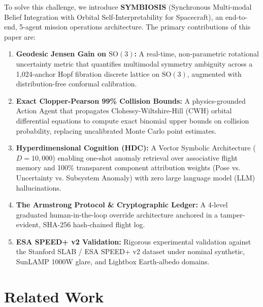 \documentclass[conference]{IEEEtran}
\begin{document}
To solve this challenge, we introduce \textbf{SYMBIOSIS} (Synchronous Multi-modal Belief Integration with Orbital Self-Interpretability for Spacecraft), an end-to-end, 5-agent mission operations architecture. The primary contributions of this paper are:
\begin{enumerate}
    \item \textbf{Geodesic Jensen Gain on $\mathrm{SO}(3)$:} A real-time, non-parametric rotational uncertainty metric that quantifies multimodal symmetry ambiguity across a 1,024-anchor Hopf fibration discrete lattice on $\mathrm{SO}(3)$, augmented with distribution-free conformal calibration.
    \item \textbf{Exact Clopper-Pearson 99\% Collision Bounds:} A physics-grounded Action Agent that propagates Clohessy-Wiltshire-Hill (CWH) orbital differential equations to compute exact binomial upper bounds on collision probability, replacing uncalibrated Monte Carlo point estimates.
    \item \textbf{Hyperdimensional Cognition (HDC):} A Vector Symbolic Architecture ($D=10,000$) enabling one-shot anomaly retrieval over associative flight memory and 100\% transparent component attribution weights (Pose vs. Uncertainty vs. Subsystem Anomaly) with zero large language model (LLM) hallucinations.
    \item \textbf{The Armstrong Protocol \& Cryptographic Ledger:} A 4-level graduated human-in-the-loop override architecture anchored in a tamper-evident, SHA-256 hash-chained flight log.
    \item \textbf{ESA SPEED+ v2 Validation:} Rigorous experimental validation against the Stanford SLAB / ESA SPEED+ v2 dataset under nominal synthetic, SunLAMP 1000W glare, and Lightbox Earth-albedo domains.
\end{enumerate}

\section{Related Work}
\end{document}
